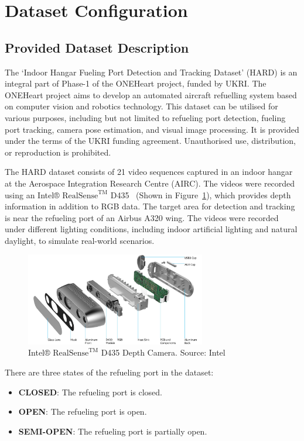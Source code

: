 \documentclass[12pt,oneside]{book} %
\begin{document}
\section{Dataset Configuration}
\subsection{Provided Dataset Description}
The `Indoor Hangar Fueling Port Detection and Tracking Dataset' (HARD) is an
integral part of Phase-1 of the ONEHeart project, funded by UKRI. The ONEHeart
project aims to develop an automated aircraft refuelling system based on
computer vision and robotics technology. This dataset can be utilised for
various purposes, including but not limited to refueling port detection,
fueling port tracking, camera pose estimation, and visual image processing. It
is provided under the terms of the UKRI funding agreement. Unauthorised use,
distribution, or reproduction is prohibited.

The HARD dataset consists of 21 video sequences captured in an indoor hangar at
the Aerospace Integration Research Centre (AIRC). The videos were recorded
using an Intel® ${\text{RealSense}}^{\text{TM}}$ D435~\cite{IntelRealSense}
(Shown in Figure~\ref{fig:intel-realsense-d435}), which provides depth
information in addition to RGB data. The target area for detection and tracking
is near the refueling port of an Airbus A320 wing. The videos were recorded
under different lighting conditions, including indoor artificial lighting and
natural daylight, to simulate real-world scenarios.

\begin{figure}[H]
    \centering
    \includegraphics[width=0.7\textwidth]{figures/depth-camera-d435_details.jpg}
    \caption{Intel® ${\text{RealSense}}^{\text{TM}}$ D435 Depth Camera. Source: Intel}\label{fig:intel-realsense-d435}
\end{figure}

There are three states of the refueling port in the dataset:
\begin{itemize}
    \item \textbf{CLOSED}: The refueling port is closed.
    \item \textbf{OPEN}: The refueling port is open.
    \item \textbf{SEMI-OPEN}: The refueling port is partially open.
\end{itemize}
\end{document}
